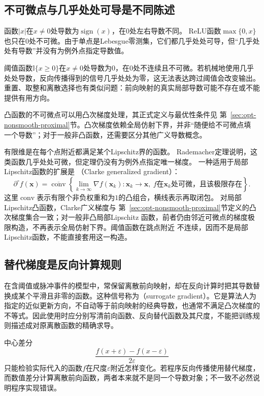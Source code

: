 \subsection{不可微点与几乎处处可导是不同陈述}

函数$|x|$在$x\neq0$处导数为$\operatorname{sign}(x)$，在$0$处左右导数不同。 ReLU函数$\max\{0,x\}$也只在$0$处不可微。由于单点是Lebesgue零测集，它们都几乎处处可导，但“几乎处处有导数”并没有为例外点指定导数值。

阈值函数$\mathbb{I}\{x\geq0\}$在$x\neq0$处导数为$0$，在$0$处不连续且不可微。若机械地使用几乎处处导数，反向传播得到的信号几乎处处为零，这无法表达跨过阈值会改变输出。重置、取整和离散选择也有类似问题：前向映射的真实局部导数可能不存在或不能提供有用方向。

凸函数的不可微点可以用凸次梯度处理，其正式定义与最优性条件见
第~\ref{sec:opt-nonsmooth-proximal}节。凸次梯度依赖全局仿射下界，并非“随便给不可微点填
一个导数”；对于一般非凸函数，还需要区分其他广义导数概念。

有限维是在每个点附近都满足某个Lipschitz界的函数。
Rademacher定理说明，这类函数几乎处处可微，但定理仍没有为例外点指定唯一梯度。
一种适用于局部Lipschitz函数的扩展是
（Clarke generalized gradient）：
\[
  \partial^\circ f(\bm{x})
  =
  \overline{\operatorname{conv}}
  \left\{
    \lim_{k\to\infty}\nabla f(\bm{x}_k):
    \bm{x}_k\to\bm{x},\
    f\text{在}\bm{x}_k\text{处可微，且该极限存在}
  \right\}.
\]
这里$\operatorname{conv}$表示有限个非负权重和为$1$的凸组合，横线表示再取闭包。
对局部Lipschitz凸函数，Clarke广义梯度与
第~\ref{sec:opt-nonsmooth-proximal}节定义的凸次梯度集合一致；对一般非凸局部Lipschitz
函数，前者仍由邻近可微点的梯度极限构造，不再表示全局仿射下界。阈值函数在跳点附近
不连续，因而不是局部Lipschitz函数，不能直接套用这一构造。
\subsection{替代梯度是反向计算规则}

在含阈值或脉冲事件的模型中，常保留离散前向映射，却在反向计算时把其导数替换成某个平滑且非零的函数。这种信号称为（surrogate gradient）。它是算法人为指定的近似更新方向，不自动等于前向映射的经典导数，也通常不满足凸次梯度的不等式。因此使用时应分别写清前向函数、反向替代函数及其尺度，不能把训练规则描述成对原离散函数的精确求导。

中心差分
\[   \frac{f(x+\varepsilon)-f(x-\varepsilon)}{2\varepsilon} \]
只能检验实际代入的函数$f$在尺度$\varepsilon$附近怎样变化。若程序反向传播使用替代梯度，而数值差分计算离散前向函数，两者本来就不是同一个导数对象；不一致不必然说明程序实现错误。
